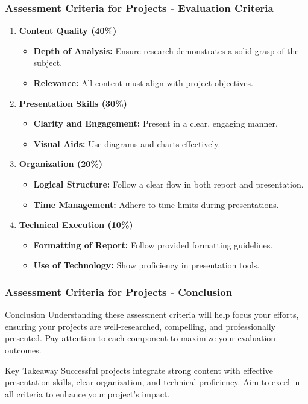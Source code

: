 \documentclass[aspectratio=169]{beamer}
\begin{document}
\begin{frame}[fragile]
    \frametitle{Assessment Criteria for Projects - Evaluation Criteria}
    \begin{enumerate}
        \item \textbf{Content Quality (40\%)}
            \begin{itemize}
                \item \textbf{Depth of Analysis:} Ensure research demonstrates a solid grasp of the subject.
                \item \textbf{Relevance:} All content must align with project objectives.
            \end{itemize}

        \item \textbf{Presentation Skills (30\%)}
            \begin{itemize}
                \item \textbf{Clarity and Engagement:} Present in a clear, engaging manner.
                \item \textbf{Visual Aids:} Use diagrams and charts effectively.
            \end{itemize}
        
        \item \textbf{Organization (20\%)}
            \begin{itemize}
                \item \textbf{Logical Structure:} Follow a clear flow in both report and presentation.
                \item \textbf{Time Management:} Adhere to time limits during presentations.
            \end{itemize}

        \item \textbf{Technical Execution (10\%)}
            \begin{itemize}
                \item \textbf{Formatting of Report:} Follow provided formatting guidelines.
                \item \textbf{Use of Technology:} Show proficiency in presentation tools.
            \end{itemize}
    \end{enumerate}
\end{frame}

\begin{frame}[fragile]
    \frametitle{Assessment Criteria for Projects - Conclusion}
    \begin{block}{Conclusion}
        Understanding these assessment criteria will help focus your efforts, ensuring your projects are well-researched, compelling, and professionally presented. 
        Pay attention to each component to maximize your evaluation outcomes.
    \end{block}
    \begin{block}{Key Takeaway}
        Successful projects integrate strong content with effective presentation skills, clear organization, and technical proficiency. Aim to excel in all criteria to enhance your project’s impact.
    \end{block}
\end{frame}
\end{document}
